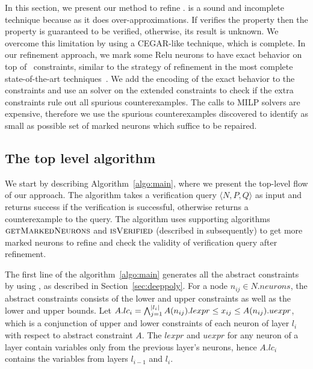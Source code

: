 In this section, we present our method to refine \deeppoly{}. \deeppoly{} is a sound and incomplete technique because as it does over-approximations. If \deeppoly{} verifies the property then the property is guaranteed to be verified, otherwise, its result is unknown. We overcome this limitation by using a CEGAR-like technique, which is complete. In our refinement approach, we mark some Relu neurons to have exact behavior on top of~\deeppoly{} constraints, similar to the strategy of refinement in the most complete state-of-the-art techniques~\cite{wang2021beta,xu2020fast}. We add the encoding of the exact behavior to the~\deeppoly{} constraints and use an \milp{} solver on the extended constraints to check if the extra constraints rule out all spurious counterexamples. The calls to MILP solvers are expensive, therefore we use the spurious counterexamples discovered to identify as small as possible set of marked neurons which suffice to be repaired. %

\subsection{The top level algorithm}
\label{sec:toplevelalgo}
We start by describing Algorithm~\ref{algo:main}, where we present the top-level flow of our approach. The algorithm takes a verification query $\langle N,P,Q \rangle$ as input and returns success if the verification is successful, otherwise returns a counterexample to the query. The algorithm uses supporting algorithms $\textsc{getMarkedNeurons}$ and $\textsc{isVerified}$ (described in subsequently) to get more marked neurons to refine and check the validity of verification query after refinement.

The first line of the algorithm~\ref{algo:main} generates all the abstract constraints by using \deeppoly{}, as described in Section~\ref{sec:deeppoly}. For a node $n_{ij} \in N.neurons$, the abstract constraints consists of the lower and upper constraints as well as the lower and upper bounds. Let $A.lc_i = \bigwedge_{j=1}^{|l_i|} A(n_{ij}).lexpr \leq x_{ij} \leq  A(n_{ij}).uexpr$, which is a conjunction of upper and lower constraints of each neuron of layer $l_i$ with respect to abstract constraint $A$. The $lexpr$ and $uexpr$ for any neuron of a layer contain variables only from the previous layer's neurons, hence $A.lc_i$ contains the variables from layers $l_{i-1}$ and $l_i$. 

